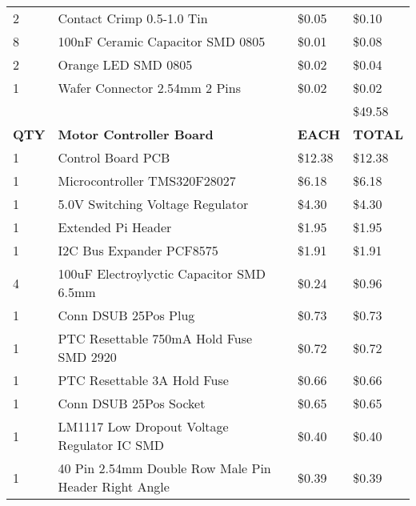 \begin{table}[h]
{\begin{tabular}{llll}
2            & Contact Crimp 0.5-1.0 Tin                            & \$0.05        & \$0.10         \\
8            & 100nF Ceramic Capacitor SMD 0805                     & \$0.01        & \$0.08         \\
2            & Orange LED SMD 0805                                  & \$0.02        & \$0.04         \\
1            & Wafer Connector 2.54mm 2 Pins                        & \$0.02        & \$0.02         \\
             &                                                      &               & \$49.58        \\  \hline \hline
\textbf{QTY} & \textbf{Motor Controller Board}                      & \textbf{EACH} & \textbf{TOTAL} \\
1            & Control Board PCB                                    & \$12.38       & \$12.38        \\
1            & Microcontroller TMS320F28027                         & \$6.18        & \$6.18         \\
1            & 5.0V Switching Voltage Regulator                     & \$4.30        & \$4.30         \\
1            & Extended Pi Header                                   & \$1.95        & \$1.95         \\
1            & I2C Bus Expander PCF8575                             & \$1.91        & \$1.91         \\
4            & 100uF Electroylyctic Capacitor SMD 6.5mm             & \$0.24        & \$0.96         \\
1            & Conn DSUB 25Pos Plug                                 & \$0.73        & \$0.73         \\
1            & PTC Resettable 750mA Hold Fuse SMD 2920              & \$0.72        & \$0.72         \\
1            & PTC Resettable 3A Hold Fuse                          & \$0.66        & \$0.66         \\
1            & Conn DSUB 25Pos Socket                               & \$0.65        & \$0.65         \\
1            & LM1117 Low Dropout Voltage Regulator IC SMD          & \$0.40        & \$0.40         \\
1            & 40 Pin 2.54mm Double Row Male Pin Header Right Angle & \$0.39        & \$0.39         \\

\end{tabular}}
\end{table}
